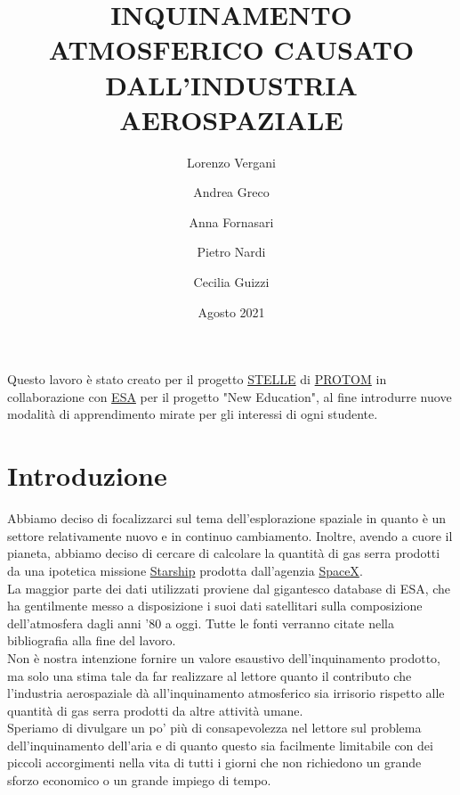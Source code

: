 \documentclass[11pt]{article}
\begin{document}
\title{\huge{\textbf{\textcolor{title_blue}{INQUINAMENTO ATMOSFERICO CAUSATO DALL'INDUSTRIA AEROSPAZIALE}}}}

\author{Lorenzo Vergani \and Andrea Greco \and Anna Fornasari \and Pietro Nardi \and Cecilia Guizzi}
\date{Agosto 2021}
\maketitle

\vspace{11em}
\begin{center}
    Questo lavoro è stato creato per il progetto \href{https://www.protom.com/2021/01/20/new-education-progetti-innovativi-in-collaborazione-con-lesa-agenzia-spaziale-europea/}{STELLE} di \href{https://www.protom.com}{PROTOM} in collaborazione con \href{https://business.esa.int/funding/invitation-to-tender/new-education}{ESA} per il progetto "New Education", al fine introdurre nuove modalità di apprendimento mirate per gli interessi di ogni studente.
\end{center}

\newpage
\tableofcontents
\newpage
\section{Introduzione}
Abbiamo deciso di focalizzarci sul tema dell'esplorazione spaziale in quanto è un settore relativamente nuovo e in continuo cambiamento. Inoltre, avendo a cuore il pianeta, abbiamo deciso di cercare di calcolare la quantità di gas serra prodotti da una ipotetica missione \href{https://www.spacex.com/vehicles/starship/}{Starship} prodotta dall'agenzia \href{https://www.spacex.com/}{SpaceX}.\\
La maggior parte dei dati utilizzati proviene dal gigantesco database di ESA, che ha gentilmente messo a disposizione i suoi dati satellitari sulla composizione dell'atmosfera dagli anni '80 a oggi. Tutte le fonti verranno citate nella bibliografia alla fine del lavoro.\\
Non è nostra intenzione fornire un valore esaustivo dell'inquinamento prodotto, ma solo una stima tale da far realizzare al lettore quanto il contributo che l'industria aerospaziale dà all'inquinamento atmosferico sia irrisorio rispetto alle quantità di gas serra prodotti da altre attività umane.\\
Speriamo di divulgare un po' più di consapevolezza nel lettore sul problema dell'inquinamento dell'aria e di quanto questo sia facilmente limitabile con dei piccoli accorgimenti nella vita di tutti i giorni che non richiedono un grande sforzo economico o un grande impiego di tempo.
\newpage
{}
\end{document}
